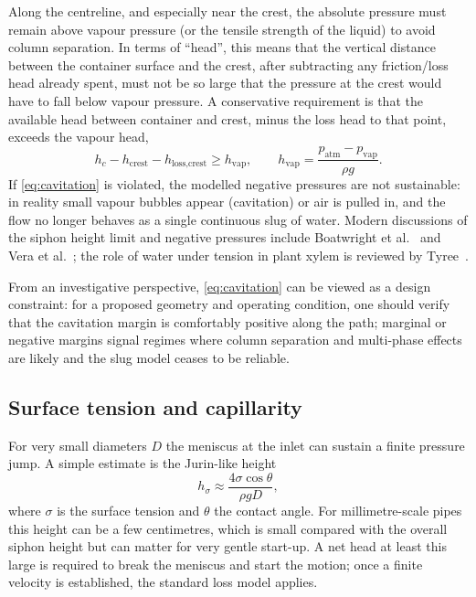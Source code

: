 \documentclass[11pt]{article}
\begin{document}
Along the centreline, and especially near the crest, the absolute pressure must remain above
vapour pressure (or the tensile strength of the liquid) to avoid column separation. In terms of
``head'', this means that the vertical distance between the container surface and the crest,
after subtracting any friction/loss head already spent, must not be so large that the pressure at
the crest would have to fall below vapour pressure. A conservative requirement is that the
available head between container and crest, minus the loss head to that point, exceeds
the vapour head,
\begin{equation}
  h_c - h_{\text{crest}} - h_{\text{loss,crest}} \ge h_{\mathrm{vap}},\qquad
  h_{\mathrm{vap}} = \frac{p_{\mathrm{atm}}-p_{\mathrm{vap}}}{\rho g}.
  \label{eq:cavitation}
\end{equation}
If \eqref{eq:cavitation} is violated, the modelled negative pressures are not sustainable:
in reality small vapour bubbles appear (cavitation) or air is pulled in, and the flow
no longer behaves as a single continuous slug of water. Modern discussions of the siphon
height limit and negative pressures include Boatwright et al.~\cite{boatwright} and
Vera et al.~\cite{vera}; the role of water under tension in plant xylem is reviewed by
Tyree~\cite{tyree}.

From an investigative perspective, \cref{eq:cavitation} can be viewed as a design constraint:
for a proposed geometry and operating condition, one should verify that the cavitation margin
is comfortably positive along the path; marginal or negative margins signal regimes where
column separation and multi-phase effects are likely and the slug model ceases to be reliable.

\subsection{Surface tension and capillarity}

For very small diameters $D$ the meniscus at the inlet can sustain a finite pressure jump.
A simple estimate is the Jurin-like height
\[
  h_{\sigma}\approx \frac{4\sigma\cos\theta}{\rho g D},
\]
where $\sigma$ is the surface tension and $\theta$ the contact angle. For millimetre-scale
pipes this height can be a few centimetres, which is small compared with the overall
siphon height but can matter for very gentle start-up. A net head at least this large is
required to break the meniscus and start the motion; once a finite velocity is established,
the standard loss model applies.
\end{document}
